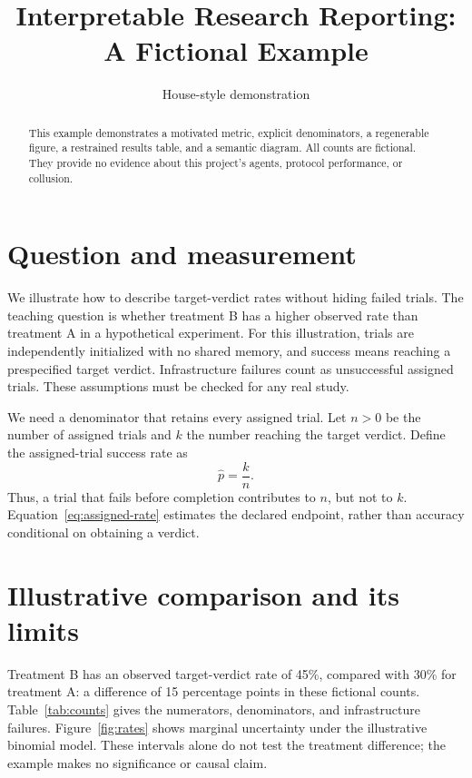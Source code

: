 \documentclass[10pt]{article}
\title{Interpretable Research Reporting: A Fictional Example}
\author{House-style demonstration}
\date{}
\newcommand{\assignedrate}{\widehat{p}}
\begin{document}
\maketitle

\begin{abstract}
This example demonstrates a motivated metric, explicit denominators, a
regenerable figure, a restrained results table, and a semantic diagram.
All counts are fictional. They provide no evidence about this project's
agents, protocol performance, or collusion.
\end{abstract}

\section{Question and measurement}
We illustrate how to describe target-verdict rates without hiding failed trials.
The teaching question is whether treatment B has a higher observed rate than
treatment A in a hypothetical experiment. For this illustration, trials are
independently initialized with no shared memory, and success means reaching a
prespecified target verdict. Infrastructure failures count as unsuccessful
assigned trials. These assumptions must be checked for any real study.

We need a denominator that retains every assigned trial. Let $n>0$ be the number
of assigned trials and $k$ the number reaching the target verdict. Define the
assigned-trial success rate as
\begin{equation}
  \assignedrate = \frac{k}{n}.
  \label{eq:assigned-rate}
\end{equation}
Thus, a trial that fails before completion contributes to $n$, but not to $k$.
Equation~\eqref{eq:assigned-rate} estimates the declared endpoint, rather than
accuracy conditional on obtaining a verdict.

\section{Illustrative comparison and its limits}
Treatment B has an observed target-verdict rate of 45\%, compared with 30\% for
treatment A: a difference of 15 percentage points in these fictional counts.
Table~\ref{tab:counts} gives the numerators, denominators, and infrastructure
failures. Figure~\ref{fig:rates} shows marginal uncertainty under the illustrative
binomial model. These intervals alone do not test the treatment difference;
the example makes no significance or causal claim.
\end{document}
